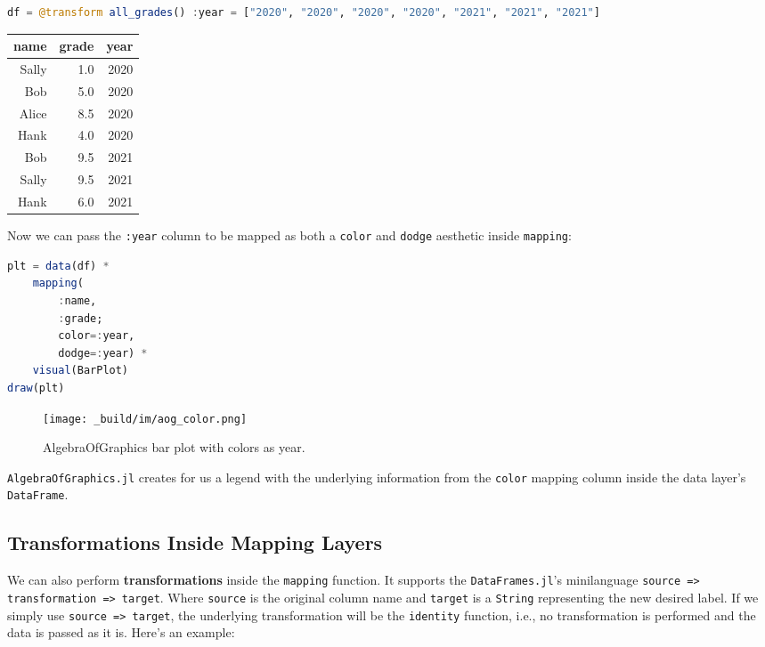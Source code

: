 \documentclass[
  notoc %
]{tufte-book}
\newcommand{\passthrough}[1]{#1}
\begin{document}
\begin{lstlisting}[language=Julia]
df = @transform all_grades() :year = ["2020", "2020", "2020", "2020", "2021", "2021", "2021"]
\end{lstlisting}

\begin{longtable}[]{@{}rrr@{}}
\toprule
name & grade & year \\
\midrule
\endhead
Sally & 1.0 & 2020 \\
Bob & 5.0 & 2020 \\
Alice & 8.5 & 2020 \\
Hank & 4.0 & 2020 \\
Bob & 9.5 & 2021 \\
Sally & 9.5 & 2021 \\
Hank & 6.0 & 2021 \\
\bottomrule
\end{longtable}

Now we can pass the \passthrough{\lstinline!:year!} column to be mapped
as both a \passthrough{\lstinline!color!} and
\passthrough{\lstinline!dodge!} aesthetic inside
\passthrough{\lstinline!mapping!}:

\begin{lstlisting}[language=Julia]
plt = data(df) *
    mapping(
        :name,
        :grade;
        color=:year,
        dodge=:year) *
    visual(BarPlot)
draw(plt)
\end{lstlisting}

\begin{figure}
\hypertarget{fig:aog_color}{%
\centering
\texttt{[image: \_build/im/aog\_color.png]}
\caption{AlgebraOfGraphics bar plot with colors as
year.}\label{fig:aog_color}
}
\end{figure}

\passthrough{\lstinline!AlgebraOfGraphics.jl!} creates for us a legend
with the underlying information from the \passthrough{\lstinline!color!}
mapping column inside the data layer's
\passthrough{\lstinline!DataFrame!}.

\hypertarget{sec:aog_layers_transformations}{%
\subsection{Transformations Inside Mapping
Layers}\label{sec:aog_layers_transformations}}

We can also perform \textbf{transformations} inside the
\passthrough{\lstinline!mapping!} function. It supports the
\passthrough{\lstinline!DataFrames.jl!}'s minilanguage
\passthrough{\lstinline!source => transformation => target!}. Where
\passthrough{\lstinline!source!} is the original column name and
\passthrough{\lstinline!target!} is a \passthrough{\lstinline!String!}
representing the new desired label. If we simply use
\passthrough{\lstinline!source => target!}, the underlying
transformation will be the \passthrough{\lstinline!identity!} function,
i.e., no transformation is performed and the data is passed as it is.
Here's an example:
\end{document}
